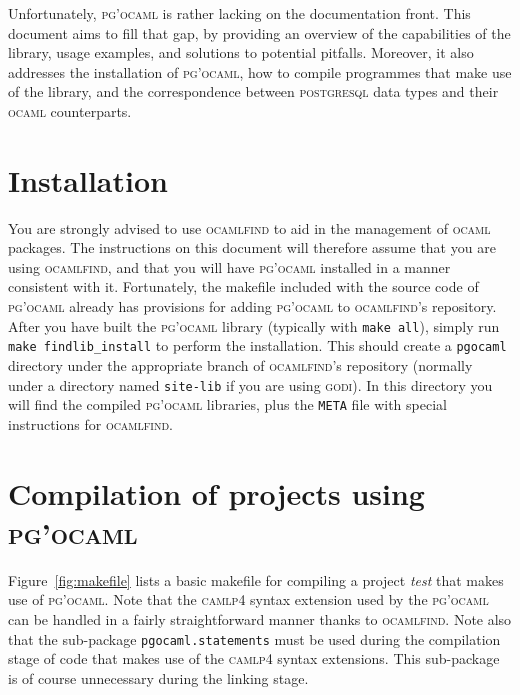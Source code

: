 \documentclass[11pt]{article}
\newcommand{\ocaml}{\textsc{ocaml}\xspace}
\newcommand{\ocamlfind}{\textsc{ocamlfind}\xspace}
\newcommand{\postgresql}{\textsc{postgresql}\xspace}
\newcommand{\pgocaml}{\textsc{pg'ocaml}\xspace}
\newcommand{\godi}{\textsc{godi}\xspace}
\newcommand{\camlp}{\textsc{camlp}{\scriptsize 4}\xspace}
\begin{document}
Unfortunately, \pgocaml is rather lacking on the documentation front.  This document
aims to fill that gap, by providing an overview of the capabilities of the library,
usage examples, and solutions to potential pitfalls.  Moreover, it also addresses
the installation of \pgocaml, how to compile programmes that make use of the library,
and the correspondence between \postgresql data types and their \ocaml counterparts.



\section{Installation}
\label{sec:installation}

You are strongly advised to use \ocamlfind to aid in the management of \ocaml packages.
The instructions on this document will therefore assume that you are using \ocamlfind,
and that you will have \pgocaml installed in a manner consistent with it.  Fortunately,
the makefile included with the source code of \pgocaml already has provisions for
adding \pgocaml to \ocamlfind's repository.  After you have built the \pgocaml library
(typically with \texttt{make all}), simply run \texttt{make findlib\_install} to perform
the installation.  This should create a \texttt{pgocaml} directory under the appropriate
branch of \ocamlfind's repository (normally under a directory named \texttt{site-lib}
if you are using \godi).  In this directory you will find the compiled \pgocaml
libraries, plus the \texttt{META} file with special instructions for \ocamlfind.



\section{Compilation of projects using \pgocaml}
\label{makefile}

Figure~\ref{fig:makefile} lists a basic makefile for compiling a project \emph{test}
that makes use of \pgocaml.  Note that the \camlp syntax extension used by the \pgocaml
can be handled in a fairly straightforward manner thanks to \ocamlfind.  Note also
that the sub-package \texttt{pgocaml.statements} must be used during the compilation
stage of code that makes use of the \camlp syntax extensions.  This sub-package is of
course unnecessary during the linking stage.
\end{document}
